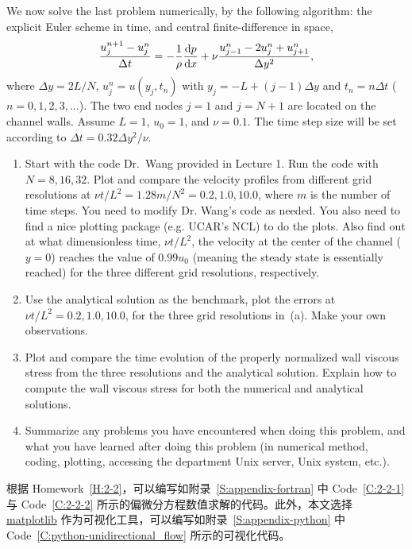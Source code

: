 \begin{homework}[label={H:2-2}]
    We now solve the last problem numerically, by the following algorithm: the explicit Euler scheme in time, and central finite-difference in space,
    \begin{equation}\label{E:2-2-1}
        \frac{u^{n+1}_j-u^n_j}{\Delta t}
        =
        -\frac{1}{\rho}\dv{p}{x} + \nu\frac{u^n_{j-1}-2u^n_j+u^n_{j+1}}{\Delta y^2},
    \end{equation}
    where $\Delta y=2L/N$, $u^n_j=u(y_j, t_n)$ with $y_j=-L+(j-1)\Delta y$ and $t_n=n\Delta t$ ($n=0, 1, 2, 3, \ldots$). The two end nodes $j=1$ and $j=N+1$ are located on the channel walls. Assume $L=1$, $u_0=1$, and $\nu=0.1$. The time step size will be set according to $\Delta t=0.32\Delta y^2/\nu$.

    \begin{enumerate}[label=(\alph*)]
        \item Start with the code Dr.\ Wang provided in Lecture 1. Run the code with $N=8, 16, 32$.  Plot and compare the velocity profiles from different grid resolutions at $\nu t/L^2=1.28m/N^2=0.2, 1.0, 10.0$, where $m$ is the number of time steps. You need to modify Dr. Wang's code as needed. You also need to find a nice plotting package (e.g. UCAR's NCL) to do the plots. Also find out at what dimensionless time, $\nu t/L^2$, the velocity at the center of the channel ($y=0$) reaches the value of $0.99u_0$ (meaning the steady state is essentially reached) for the three different grid resolutions, respectively.
        \item Use the analytical solution as the benchmark, plot the errors at $\nu t/L^2=0.2, 1.0, 10.0$, for the three grid resolutions in~(a). Make your own observations.
        \item Plot and compare the time evolution of the properly normalized wall viscous stress from the three resolutions and the analytical solution. Explain how to compute the wall viscous stress for both the numerical and analytical solutions.
        \item Summarize any problems you have encountered when doing this problem, and what you have learned after doing this problem (in numerical method, coding, plotting, accessing the department Unix server, Unix system, etc.).
    \end{enumerate}
\end{homework}

根据 Homework~\ref{H:2-2}，可以编写如附录~\ref{S:appendix-fortran} 中 Code~\ref{C:2-2-1} 与 Code~\ref{C:2-2-2} 所示的偏微分方程数值求解的代码。此外，本文选择 \href{https://github.com/matplotlib/matplotlib}{matplotlib} 作为可视化工具，可以编写如附录~\ref{S:appendix-python} 中 Code~\ref{C:python-unidirectional_flow} 所示的可视化代码。

